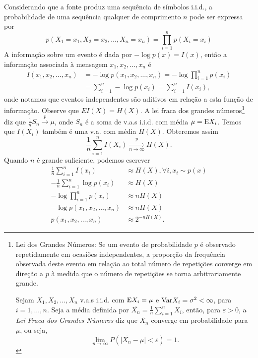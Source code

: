 Considerando que a fonte produz uma sequência de símbolos i.i.d., a probabilidade de uma
sequência qualquer de comprimento $n$ pode ser expressa por
\begin{equation}
p(X_1 = x_1, X_2 = x_2, \ldots, X_n = x_n) = \prod_{i=1}^{n} p(X_i = x_i)
\end{equation}
A informação sobre um evento é dada por $-\log p(x) = I(x)$, então a informação
associada à mensagem $x_1,x_2,\ldots,x_n$ é 
\begin{subequations}
  \begin{align}
    I(x_1,x_2,\ldots,x_n) &= - \log p(x_1, x_2, \ldots, x_n) = - \log \prod_{i=1}^n p(x_i) \\
                          &= \sum_{i=1}^n - \log p(x_i) = \sum_{i=1}^n I(x_i),
  \end{align}
\end{subequations}
onde notamos que eventos independentes são aditivos em relação a esta função de informação.
Observe que $E I(X) = H(X)$.
A lei fraca dos grandes números\footnote{
Lei dos Grandes Números: 
Se um evento de probabilidade $p$ é observado repetidamente em ocasiões independentes,
a proporção da frequência observada deste evento em relação ao total número de repetições
converge em direção a $p$ à medida que o número de repetições se torna arbitrariamente grande.

Sejam $X_1, X_2, \ldots, X_n$ v.a.s i.i.d. com $\mathrm{E} X_i = \mu$ e $\mathrm{Var} X_i = \sigma^2 < \infty$, para $i=1,\ldots,n$.
Seja a média definida por $\overline{X_n} = \frac{1}{n} \sum_{i=1}^{n} X_i$, então, para $\varepsilon > 0$,
a \emph{Lei Fraca dos Grandes Números} diz que $\overline{X_n}$ converge em probabilidade para $\mu$, ou seja,
\begin{equation}
\lim_{n \rightarrow \infty} P \left( \vert \overline{X_n} - \mu \vert < \varepsilon  \right) = 1 .
\end{equation}
}
diz que $\frac{1}{n} S_n \xrightarrow{p} \mu$, onde $S_n$ é a soma
de v.a.s i.i.d. com média $\mu = \mathrm{E} X_i$. Temos que $I(X_i)$ também é uma v.a. com média $H(X)$.
Obteremos assim
\begin{equation}
  \frac{1}{n} \sum_{i=1}^n I(X_i) \xrightarrow[n \rightarrow \infty]{p} H(X) .
\end{equation}
Quando $n$ é grande suficiente, podemos escrever
\begin{subequations}
  \begin{align}
     \frac{1}{n} \sum_{i=1}^n I(x_i)        &\approx H(X) , \forall i, x_i \sim p(x) \\
     - \frac{1}{n} \sum_{i=1}^n \log p(x_i) &\approx H(X) \\
     - \log \prod_{i=1}^n p(x_i)            &\approx n H(X) \\
     - \log p(x_1,x_2,\ldots,x_n)           &\approx n H(X) \\
     p(x_1,x_2,\ldots,x_n)                  &\approx 2^{-nH(X)} .
  \end{align}
\end{subequations}
